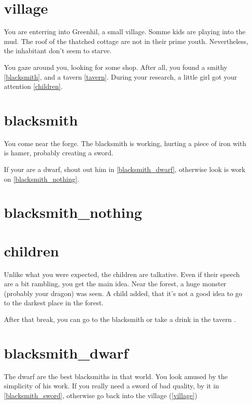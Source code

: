 
\section{village}

You are enterring into Greenhil, a small village. Somme kids are playing into
the mud. The roof of the thatched cottage are not in their prime youth.
Nevertheless, the inhabitant don't seem to starve.

You gaze around you, looking for some shop. After all, you found a smithy
\ref{blacksmith}, and a tavern \ref{tavern}. During your research, a little girl
got your attention \ref{children}.

\section{blacksmith}

You come near the forge. The blacksmith is working, hurting a piece of iron with
is hamer, probably creating a sword.

If your are a dwarf, shout out him in \ref{blacksmith_dwarf}, otherwise look is
work on \ref{blacksmith_nothing}.

\section{blacksmith_nothing}

\section{children}

Unlike what you were expected, the children are talkative. Even if their speech
are a bit rambling, you get the main idea. Near the forest, a huge monster
(probably your dragon) was seen. A child added, that it's not a good idea to go
to the darkest place in the forest.

After that break, you can go to the blacksmith \blacksmith or take a drink in
the tavern \tavern.

\section{blacksmith_dwarf}

The dwarf are the best blacksmiths in that world. You look amused by the
simplicity of his work. If you really need a sword of bad quality, by it in
\ref{blacksmith_sword}, otherwise go back into the village (\ref{village})

